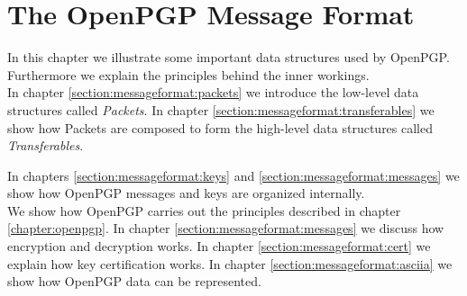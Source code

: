 \chapter{The OpenPGP Message Format} \label{chapter:messageformat}









In this chapter we illustrate some important data structures used by OpenPGP. Furthermore we explain the principles behind the inner workings. \\

In chapter \ref{section:messageformat:packets} we introduce the low-level data structures called \textit{Packets}. In chapter \ref{section:messageformat:transferables} we show how Packets are composed to form the high-level data structures called \textit{Transferables}.

In chapters \ref{section:messageformat:keys} and \ref{section:messageformat:messages} we show how OpenPGP messages and keys are organized internally. \\

We show how OpenPGP carries out the principles described in chapter \ref{chapter:openpgp}.
In chapter \ref{section:messageformat:messages} we discuss how encryption and decryption works. In chapter \ref{section:messageformat:cert} we explain how key certification works. In chapter \ref{section:messageformat:asciia} we show how OpenPGP data can be represented.

